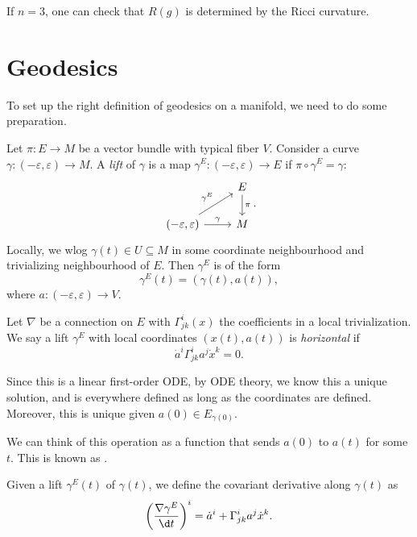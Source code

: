 \documentclass[a4paper]{article}
\begin{document}
If $n = 3$, one can check that $R(g)$ is determined by the Ricci curvature.

\section{Geodesics}
To set up the right definition of geodesics on a manifold, we need to do some preparation.

\begin{defi}[Lift]
  Let $\pi: E \to M$ be a vector bundle with typical fiber $V$. Consider a curve $\gamma: (-\varepsilon, \varepsilon) \to M$. A \emph{lift} of $\gamma$ is a map $\gamma^E: (-\varepsilon, \varepsilon) \to E$ if $\pi \circ \gamma^E = \gamma$:
  \[
    \begin{tikzcd}
      & E \ar[d, "\pi"]\\
      (-\varepsilon, \varepsilon) \ar[r, "\gamma"] \ar[ur, "\gamma^E"] & M
    \end{tikzcd}.
  \]
  Locally, we wlog $\gamma(t) \in U \subseteq M$ in some coordinate neighbourhood and trivializing neighbourhood of $E$. Then $\gamma^E$ is of the form
  \[
    \gamma^E(t) = (\gamma(t), a(t)),
  \]
  where $a: (-\varepsilon, \varepsilon) \to V$.
\end{defi}

\begin{defi}
  Let $\nabla$ be a connection on $E$ with $\Gamma^i_{jk}(x)$ the coefficients in a local trivialization. We say a lift $\gamma^E$ with local coordinates $(x(t), a(t))$ is \emph{horizontal} if
  \[
    \dot{a}^i \Gamma^i_{jk} a^j \dot{x}^k = 0.
  \] %
\end{defi}
Since this is a linear first-order ODE, by ODE theory, we know this a unique solution, and is everywhere defined as long as the coordinates are defined. Moreover, this is unique given $a(0) \in E_{\gamma(0)}$.

We can think of this operation as a function that sends $a(0)$ to $a(t)$ for some $t$. This is known as .

\begin{defi}
  Given a lift $\gamma^E(t)$ of $\gamma(t)$, we define the covariant derivative along $\gamma(t)$ as
  \[
    \left(\frac{\nabla \gamma^E}{\d t}\right)^i = \dot{a}^i + \Gamma^i_{jk} a^j \dot{x}^k.
  \]
\end{defi}
\end{document}
